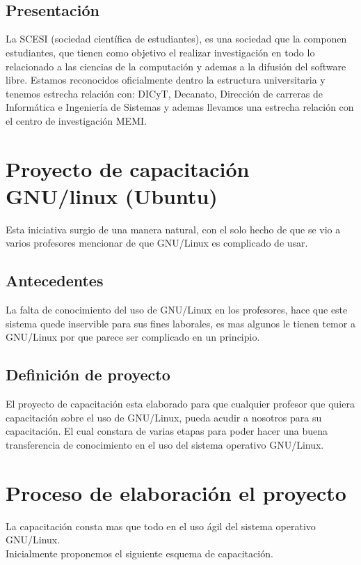 \documentclass[11pt,letterpaper]{article}
\newcommand\BackgroundPic{
\put(497,728){
\parbox[b][\paperheight]{\paperwidth}{%
\texttt{[image: img/1.png]}%
}}}
\begin{document}
\AddToShipoutPicture{\BackgroundPic}
~\\
~\\
\begin{center}
\section*{Presentación}
\end{center}
La SCESI (sociedad científica de estudiantes), es una sociedad que la componen estudiantes, que tienen como objetivo el realizar investigación en todo lo relacionado a las ciencias de la computación y ademas a la difusión del software libre. Estamos reconocidos oficialmente dentro la estructura universitaria y tenemos estrecha relación con: DICyT, Decanato, Dirección de carreras de Informática e Ingeniería de Sistemas y ademas llevamos una estrecha relación con el centro de investigación MEMI.\\

\section{Proyecto de capacitación GNU/linux (Ubuntu)}
Esta iniciativa surgio de una manera natural, con el solo hecho de  que se vio a varios profesores mencionar de que GNU/Linux es complicado de usar.
\subsection{Antecedentes}
La falta de conocimiento del uso de GNU/Linux en los profesores, hace que este sistema quede inservible para sus fines laborales, es mas algunos le tienen temor a GNU/Linux por que parece ser complicado en un principio. 
\subsection{Definición de proyecto}
El proyecto de capacitación esta elaborado para que cualquier profesor que quiera capacitación sobre el uso de GNU/Linux, pueda acudir a nosotros para su capacitación. El cual constara de varias etapas para poder hacer una buena transferencia de conocimiento en el uso del sistema operativo GNU/Linux.\\

\section{Proceso de elaboración el proyecto}
La capacitación consta mas que todo en el uso ágil del sistema operativo GNU/Linux.\\
Inicialmente proponemos el siguiente esquema de capacitación.
\end{document}
